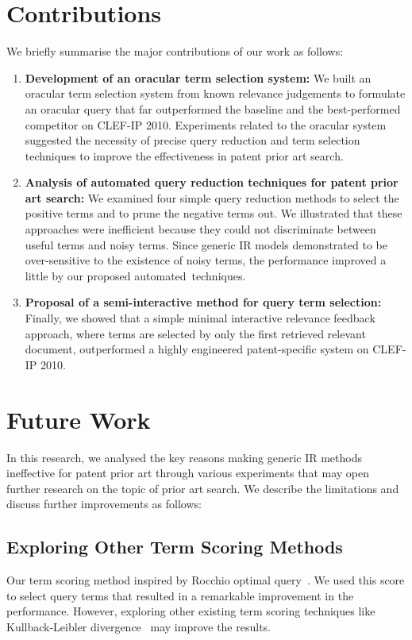 \section{Contributions}
\label{sec:contributions}
We briefly summarise the major contributions of our work as follows:
\begin{enumerate}
\item \textbf{Development of an oracular term selection system: }We built an oracular term selection system from known relevance judgements to formulate an oracular query that far outperformed the baseline and the best-performed competitor on CLEF-IP 2010. 
Experiments related to the oracular system suggested the necessity of precise query
reduction and term selection techniques to improve the effectiveness in patent
prior art search.
\item \textbf{Analysis of automated query reduction techniques for patent prior art search: } We examined four simple query reduction methods to select the positive terms and to prune the negative terms out. We illustrated that these approaches were inefficient because they could not discriminate between useful terms and noisy terms. Since generic IR models demonstrated to be over-sensitive to the existence of noisy terms, the performance improved a little by our proposed automated~techniques. 
\item \textbf{Proposal of a semi-interactive method for query term selection: }Finally, we showed that a simple minimal interactive relevance feedback approach, where terms are selected by only the first retrieved relevant document, outperformed a highly engineered patent-specific system on CLEF-IP 2010. 
\end{enumerate}

\section{Future Work}
\label{sec:future}
In this research, we analysed the key reasons making generic IR methods ineffective for patent prior art through various experiments that may open further research on the topic of prior art search. We describe the limitations and discuss further improvements as follows: 
\subsection{Exploring Other Term Scoring Methods}
\label{subsec:ExploringTermScoringMethods}
Our term scoring method inspired by Rocchio optimal query~\citep[p.181]{manning2008introduction}. We used this score to select query terms that resulted in a remarkable improvement in the performance. However, exploring other existing term scoring techniques like Kullback-Leibler divergence~\citep{Baeza-Yates2011} may improve the results.

